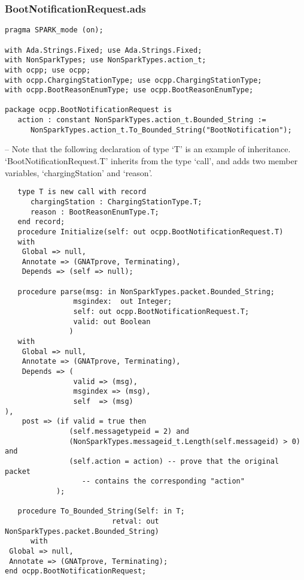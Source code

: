 \documentclass[12pt,openany,a4paper]{book}
\begin{document}
\subsubsection{BootNotificationRequest.ads}
\begin{verbatim}
pragma SPARK_mode (on); 

with Ada.Strings.Fixed; use Ada.Strings.Fixed;
with NonSparkTypes; use NonSparkTypes.action_t; 
with ocpp; use ocpp;
with ocpp.ChargingStationType; use ocpp.ChargingStationType;
with ocpp.BootReasonEnumType; use ocpp.BootReasonEnumType;

package ocpp.BootNotificationRequest is
   action : constant NonSparkTypes.action_t.Bounded_String :=
      NonSparkTypes.action_t.To_Bounded_String("BootNotification"); 
\end{verbatim}
-- Note that the following declaration of type `T' is an example of inheritance. `BootNotificationRequest.T' inherits from the type `call', and adds two member variables, `chargingStation' and `reason'.
\begin{verbatim}
   type T is new call with record
      chargingStation : ChargingStationType.T;
      reason : BootReasonEnumType.T;
   end record;
   procedure Initialize(self: out ocpp.BootNotificationRequest.T)
   with
    Global => null,
    Annotate => (GNATprove, Terminating),
    Depends => (self => null);

   procedure parse(msg: in NonSparkTypes.packet.Bounded_String;
                msgindex:  out Integer;
                self: out ocpp.BootNotificationRequest.T;
                valid: out Boolean
               )
   with
    Global => null,
    Annotate => (GNATprove, Terminating),
    Depends => (
                valid => (msg),
                msgindex => (msg),
                self  => (msg)
),
    post => (if valid = true then
               (self.messagetypeid = 2) and
               (NonSparkTypes.messageid_t.Length(self.messageid) > 0) and
               (self.action = action) -- prove that the original packet 
                  -- contains the corresponding "action"
            );

   procedure To_Bounded_String(Self: in T;
                         retval: out NonSparkTypes.packet.Bounded_String)
      with
 Global => null,
 Annotate => (GNATprove, Terminating);
end ocpp.BootNotificationRequest;
\end{verbatim}
\end{document}
